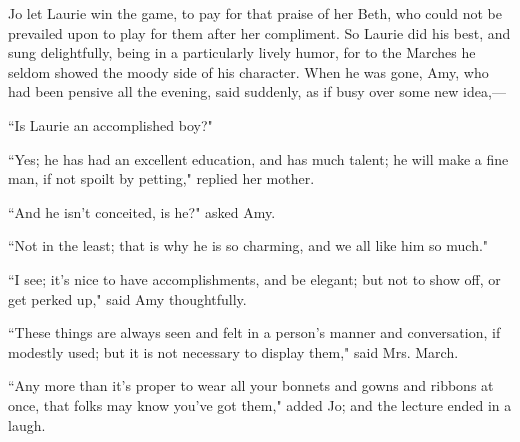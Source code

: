 Jo let Laurie win the game, to pay for that praise of her Beth, who
could not be prevailed upon to play for them after her compliment. So
Laurie did his best, and sung delightfully, being in a particularly
lively humor, for to the Marches he seldom showed the moody side of his
character. When he was gone, Amy, who had been pensive all the evening,
said suddenly, as if busy over some new idea,---

``Is Laurie an accomplished boy?"

``Yes; he has had an excellent education, and has much talent; he will
make a fine man, if not spoilt by petting," replied her mother.

``And he isn't conceited, is he?" asked Amy.

``Not in the least; that is why he is so charming, and we all like him so
much."

``I see; it's nice to have accomplishments, and be
elegant; but not to show off, or get perked up," said Amy thoughtfully.

``These things are always seen and felt in a person's
manner and conversation, if modestly used; but it is not necessary to
display them," said Mrs. March.

``Any more than it's proper to wear all your bonnets and
gowns and ribbons at once, that folks may know you've
got them," added Jo; and the lecture ended in a laugh.
